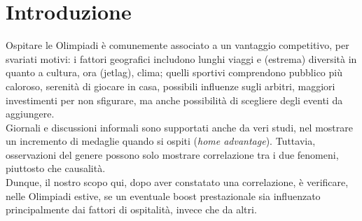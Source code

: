 \section{Introduzione}\label{sec:intro}

Ospitare le Olimpiadi è comunemente associato a un vantaggio competitivo, per
svariati motivi: i fattori geografici includono lunghi viaggi e (estrema)
diversità in quanto a cultura, ora (jetlag), clima; quelli sportivi comprendono
pubblico più caloroso, serenità di giocare in casa, possibili influenze sugli
arbitri, maggiori investimenti per non sfigurare, ma anche possibilità di
scegliere degli eventi da aggiungere.\\
Giornali e discussioni informali sono supportati anche da veri studi, nel
mostrare un incremento di medaglie quando si ospiti (\textit{home advantage}).
Tuttavia, osservazioni del genere possono solo mostrare correlazione tra i due
fenomeni, piuttosto che causalità.\\
Dunque, il nostro scopo qui, dopo aver constatato una correlazione, è
verificare, nelle Olimpiadi estive, se un eventuale boost prestazionale sia
influenzato principalmente dai fattori di ospitalità, invece che da altri.